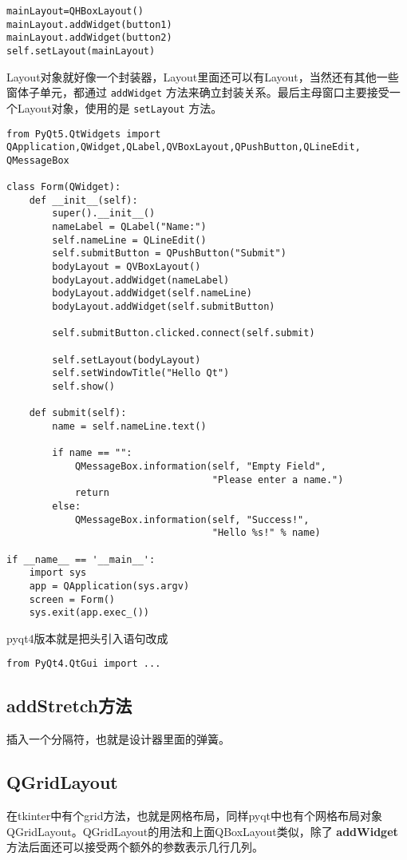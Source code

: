 \documentclass[11pt,oneside]{article}
\begin{document}
\begin{Verbatim}
mainLayout=QHBoxLayout()
mainLayout.addWidget(button1)
mainLayout.addWidget(button2)
self.setLayout(mainLayout)
\end{Verbatim}


Layout对象就好像一个封装器，Layout里面还可以有Layout，当然还有其他一些窗体子单元，都通过 \texttt{addWidget} 方法来确立封装关系。最后主母窗口主要接受一个Layout对象，使用的是 \texttt{setLayout} 方法。

\begin{verbatim}
from PyQt5.QtWidgets import QApplication,QWidget,QLabel,QVBoxLayout,QPushButton,QLineEdit, QMessageBox

class Form(QWidget):
    def __init__(self):
        super().__init__()
        nameLabel = QLabel("Name:")
        self.nameLine = QLineEdit()
        self.submitButton = QPushButton("Submit")
        bodyLayout = QVBoxLayout()
        bodyLayout.addWidget(nameLabel)
        bodyLayout.addWidget(self.nameLine)
        bodyLayout.addWidget(self.submitButton)

        self.submitButton.clicked.connect(self.submit)

        self.setLayout(bodyLayout)
        self.setWindowTitle("Hello Qt")
        self.show()

    def submit(self):
        name = self.nameLine.text()

        if name == "":
            QMessageBox.information(self, "Empty Field",
                                    "Please enter a name.")
            return
        else:
            QMessageBox.information(self, "Success!",
                                    "Hello %s!" % name)

if __name__ == '__main__':
    import sys
    app = QApplication(sys.argv)
    screen = Form()
    sys.exit(app.exec_())
\end{verbatim}


pyqt4版本就是把头引入语句改成
\begin{Verbatim}
from PyQt4.QtGui import ...
\end{Verbatim}




\subsection{addStretch方法}
\label{sec:orgheadline35}
插入一个分隔符，也就是设计器里面的弹簧。

\subsection{QGridLayout}
\label{sec:orgheadline36}
在tkinter中有个grid方法，也就是网格布局，同样pyqt中也有个网格布局对象QGridLayout。QGridLayout的用法和上面QBoxLayout类似，除了 \textbf{addWidget} 方法后面还可以接受两个额外的参数表示几行几列。
\end{document}
